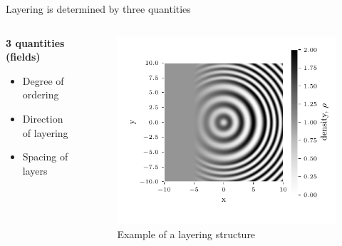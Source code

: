 \documentclass[10pt,mathserif]{beamer}
\newcommand{\extra}[1]{\color{gray} #1 \normalcolor}
\newcommand{\subheading}[1]{\large\textbf{#1}\normalsize}
\begin{document}
\begin{frame}[fragile]{Layering is determined by three quantities}
\begin{columns}
\begin{column}{0.49\textwidth}
\begin{center}
                \subheading{3 quantities \extra{(fields)}}
            \end{center}
            \begin{itemize}
                \item Degree of ordering
                \item Direction of layering %
                \item Spacing of layers
            \end{itemize}
        \end{column}
        \begin{column}{0.60\textwidth}
            \begin{figure}
                \includegraphics[width=\textwidth]{figures/layers_example.pdf}
                \caption{
                    Example of a layering structure
                }
            \end{figure}
        \end{column}
    \end{columns}
\end{frame}
\end{document}
